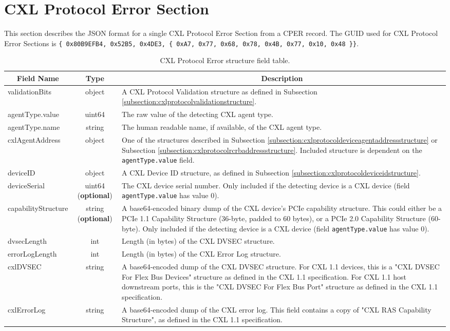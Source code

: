 \documentclass{report}
\newcommand*{\thead}[1]{\multicolumn{1}{|c|}{\bfseries #1}}
\newcommand*{\jsontable}[1]{
    \begin{table}[!ht]
    \label{#1}
    \centering
    \begin{adjustbox}{center}
    \begin{tabular}{|l|c|p{8cm}|}
    \hline
    \thead{Field Name} & \thead{Type} & \thead{Description} \\
    \hline
}
\newcommand*{\jsontableend}[1]{
    \hline
    \end{tabular}
    \end{adjustbox}
    \caption{#1}
    \label{table:#1}
    \end{table}
    \FloatBarrier
}
\begin{document}
\section{CXL Protocol Error Section}
\label{section:cxlprotocolerrorsection}
This section describes the JSON format for a single CXL Protocol Error Section from a CPER record. The GUID used for CXL Protocol Error Sections is \texttt{\{ 0x80B9EFB4, 0x52B5, 0x4DE3, \{ 0xA7, 0x77, 0x68, 0x78, 0x4B, 0x77, 0x10, 0x48 \}\}}.
\jsontable{table:cxlprotocolerrorsection}
validationBits & object & A CXL Protocol Validation structure as defined in Subsection \ref{subsection:cxlprotocolvalidationstructure}.\\
\hline
agentType.value & uint64 & The raw value of the detecting CXL agent type.\\
agentType.name & string & The human readable name, if available, of the CXL agent type.\\
\hline
cxlAgentAddress & object & One of the structures described in Subsection \ref{subsection:cxlprotocoldeviceagentaddressstructure} or Subsection \ref{subsection:cxlprotocolrcrbaddressstructure}. Included structure is dependent on the \texttt{agentType.value} field.\\
\hline
deviceID & object & A CXL Device ID structure, as defined in Subsection \ref{subsection:cxlprotocoldeviceidstructure}.\\
\hline
deviceSerial & uint64 (\textbf{optional}) & The CXL device serial number. Only included if the detecting device is a CXL device (field \texttt{agentType.value} has value 0).\\
\hline
capabilityStructure & string (\textbf{optional}) & A base64-encoded binary dump of the CXL device's PCIe capability structure. This could either be a PCIe 1.1 Capability Structure (36-byte, padded to 60 bytes), or a PCIe 2.0 Capability Structure (60-byte). Only included if the detecting device is a CXL device (field \texttt{agentType.value} has value 0).\\
\hline
dvsecLength & int & Length (in bytes) of the CXL DVSEC structure.\\
\hline
errorLogLength & int & Length (in bytes) of the CXL Error Log structure.\\
\hline
cxlDVSEC & string & A base64-encoded dump of the CXL DVSEC structure. For CXL 1.1 devices, this is a "CXL DVSEC For Flex Bus Devices" structure as defined in the CXL 1.1 specification. For CXL 1.1 host downstream ports, this is the "CXL DVSEC For Flex Bus Port" structure as defined in the CXL 1.1 specification.\\
\hline
cxlErrorLog & string & A base64-encoded dump of the CXL error log. This field contains a copy of "CXL RAS Capability Structure", as defined in the CXL 1.1 specification.\\
\jsontableend{CXL Protocol Error structure field table.}
\end{document}
